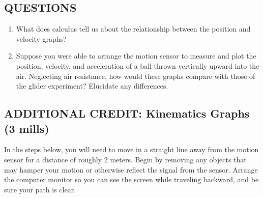 \subsection*{QUESTIONS}

\begin{enumerate}[label=\alph*.]

\item What does calculus tell us about the relationship between the position and velocity graphs?

\item Suppose you were able to arrange the motion sensor to measure and plot the position, velocity, and acceleration of a ball thrown vertically upward into the air.  Neglecting air resistance, how would these graphs compare with those of the glider experiment?  Elucidate any differences.

\end{enumerate}


\subsection*{ADDITIONAL CREDIT: Kinematics Graphs (3 mills)}
In the steps below, you will need to move in a straight line away from the
motion sensor for a distance of roughly 2 meters.  
Begin by removing any objects that may hamper your motion or otherwise reflect the signal from the sensor.  Arrange the computer monitor so you can see the screen while traveling backward, and be sure your path is clear.  

